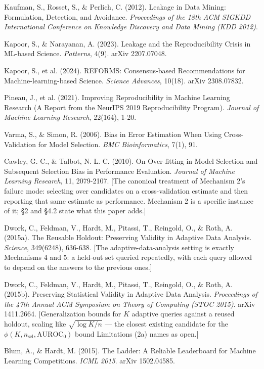 \documentclass[10pt]{article} %
\begin{document}
Kaufman, S., Rosset, S., \& Perlich, C. (2012). Leakage in Data Mining:
Formulation, Detection, and Avoidance. \emph{Proceedings of the 18th ACM
SIGKDD International Conference on Knowledge Discovery and Data Mining
(KDD 2012)}.

Kapoor, S., \& Narayanan, A. (2023). Leakage and the Reproducibility
Crisis in ML-based Science. \emph{Patterns}, 4(9). arXiv 2207.07048.

Kapoor, S., et al. (2024). REFORMS: Consensus-based Recommendations for
Machine-learning-based Science. \emph{Science Advances}, 10(18). arXiv 2308.07832.

Pineau, J., et al. (2021). Improving Reproducibility in Machine Learning
Research (A Report from the NeurIPS 2019 Reproducibility Program).
\emph{Journal of Machine Learning Research}, 22(164), 1-20.

Varma, S., \& Simon, R. (2006). Bias in Error Estimation When Using
Cross-Validation for Model Selection. \emph{BMC Bioinformatics}, 7(1), 91.

Cawley, G. C., \& Talbot, N. L. C. (2010). On Over-fitting in Model
Selection and Subsequent Selection Bias in Performance Evaluation.
\emph{Journal of Machine Learning Research}, 11, 2079-2107. [The canonical
treatment of Mechanism 2's failure mode: selecting over candidates on a
cross-validation estimate and then reporting that same estimate as
performance. Mechanism 2 is a specific instance of it; §2 and §4.2
state what this paper adds.]

Dwork, C., Feldman, V., Hardt, M., Pitassi, T., Reingold, O., \& Roth, A.
(2015a). The Reusable Holdout: Preserving Validity in Adaptive Data Analysis.
\emph{Science}, 349(6248), 636-638. [The adaptive-data-analysis setting is
exactly Mechanisms 4 and 5: a held-out set queried repeatedly, with each query
allowed to depend on the answers to the previous ones.]

Dwork, C., Feldman, V., Hardt, M., Pitassi, T., Reingold, O., \& Roth, A.
(2015b). Preserving Statistical Validity in Adaptive Data Analysis.
\emph{Proceedings of the 47th Annual ACM Symposium on Theory of Computing
(STOC 2015)}. arXiv 1411.2664. [Generalization bounds for $K$ adaptive queries
against a reused holdout, scaling like $\sqrt{\log K/n}$ --- the closest
existing candidate for the $\phi(K,n_{\text{sel}},\text{AUROC}_0)$ bound
Limitations (2a) names as open.]

Blum, A., \& Hardt, M. (2015). The Ladder: A Reliable Leaderboard for Machine
Learning Competitions. \emph{ICML 2015}. arXiv 1502.04585.
\end{document}
